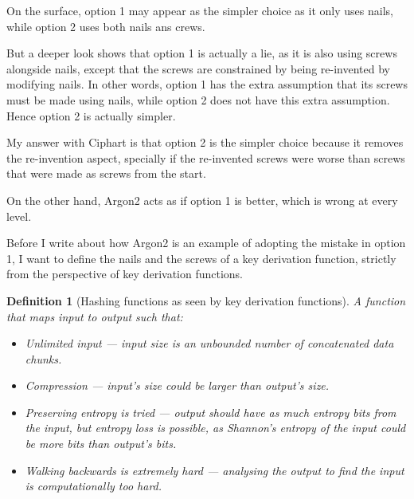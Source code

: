 \documentclass[twocolumn]{article}
\newtheorem{definition}{Definition}[section]
\begin{document}
On the surface, option 1 may appear as the simpler choice as it only uses
nails, while option 2 uses both nails ans crews.

But a deeper look shows that option 1 is actually a lie, as it is also
using screws alongside nails, except that the screws are constrained by
being re-invented by modifying nails.  In other words, option 1 has the
extra assumption that its screws must be made using nails, while option 2
does not have this extra assumption.  Hence option 2 is actually simpler.

My answer with Ciphart is that option 2 is the simpler choice
because it removes the re-invention aspect, specially if the re-invented
screws were worse than screws that were made as screws from the start.

On the other hand, Argon2 acts as if option 1 is better, which is
wrong at every level.

Before I write about how Argon2 is an example of adopting the
mistake in option 1, I want to define the nails and the screws of a key
derivation function, strictly from the perspective of key derivation
functions.

\begin{definition}[Hashing functions as seen by key derivation
functions]\label{def_kdf_hash}
    A function that maps input to output such that:
    \begin{itemize}
        \item Unlimited input --- input size is an unbounded number of
        concatenated data chunks.

        \item Compression --- input's size could be larger than output's
        size.

        \item Preserving entropy is tried --- output should have as much
        entropy bits from the input, but entropy loss is possible, as
        Shannon's entropy of the input could be more bits than output's
        bits.

        \item Walking backwards is extremely hard --- analysing the output
        to find the input is computationally too hard.
    \end{itemize}
\end{definition}
\end{document}
